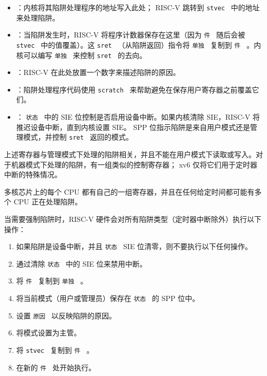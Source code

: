\documentclass[UTF8]{article}
\begin{document}
   \begin{itemize}


   \item      {}    ：内核将其陷阱处理程序的地址写入此处； RISC-V 跳转到  {    \tt    stvec   }  中的地址来处理陷阱。   \item      {}    ：当陷阱发生时，RISC-V 将程序计数器保存在这里（因为  {    \tt    件   }  随后会被  {    \tt    stvec   }  中的值覆盖）。这
  {    \tt    sret   } （从陷阱返回）指令将  {    \tt    单独   }  复制到
  {    \tt    件   }  。内核可以编写  {    \tt    单独   }  来控制  {    \tt    sret   }  的去向。   \item      {}   ：RISC-V 在此处放置一个数字来描述陷阱的原因。   \item      {}    ：陷阱处理程序代码使用  {    \tt    scratch   }  来帮助避免在保存用户寄存器之前覆盖它们。   \item      {}   ： {    \tt    状态   }  中的 SIE 位控制是否启用设备中断。如果内核清除 SIE，RISC-V 将推迟设备中断，直到内核设置 SIE。 SPP 位指示陷阱是来自用户模式还是管理模式，并控制  {    \tt    sret   }  返回的模式。  \end{itemize}     

上述寄存器与管理模式下处理的陷阱相关，并且不能在用户模式下读取或写入。对于机器模式下处理的陷阱，有一组类似的控制寄存器； xv6 仅将它们用于定时器中断的特殊情况。  

多核芯片上的每个 CPU 都有自己的一组寄存器，并且在任何给定时间都可能有多个 CPU 正在处理陷阱。  

当需要强制陷阱时，RISC-V 硬件会对所有陷阱类型（定时器中断除外）执行以下操作：  

   \begin{enumerate}


   \item   如果陷阱是设备中断，并且  {    \tt    状态   }  SIE 位清零，则不要执行以下任何操作。   \item   通过清除  {    \tt    状态   }  中的 SIE 位来禁用中断。   \item   将  {    \tt    件   }  复制到  {    \tt    单独   }  。   \item   将当前模式（用户或管理员）保存在  {    \tt    状态   }  的 SPP 位中。   \item   设置  {    \tt   原因   }  以反映陷阱的原因。   \item   将模式设置为主管。   \item   将  {    \tt    stvec   }  复制到  {    \tt    件   }  。   \item   在新的  {    \tt    件   }  处开始执行。  \end{enumerate}     
\end{document}
